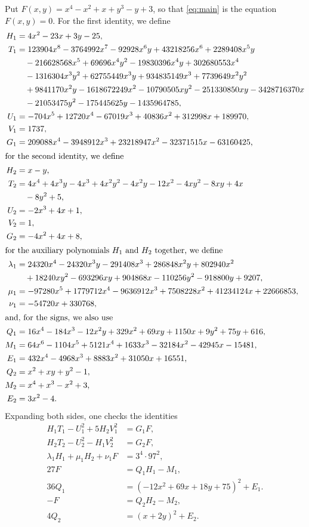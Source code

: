 \documentclass[11pt]{article}
\begin{document}
Put $F(x,y)=x^{4}-x^{2}+x+y^{3}-y+3$, so that \eqref{eq:main} is the equation $F(x,y)=0$. For the first identity, we define
\begin{align*}
H_{1}&=4x^{2}-23x+3y-25,\\
T_{1}&=123904x^{8}-3764992x^{7}-92928x^{6}y+43218256x^{6}+2289408x^{5}y\\
&\quad-216628568x^{5}+69696x^{4}y^{2}-19830396x^{4}y+302680553x^{4}\\
&\quad-1316304x^{3}y^{2}+62755449x^{3}y+934835149x^{3}+7739649x^{2}y^{2}\\
&\quad+9841170x^{2}y-1618672249x^{2}-10790505xy^{2}-251330850xy-3428716370x\\
&\quad-21053475y^{2}-175445625y-1435964785,\\
U_{1}&=-704x^{5}+12720x^{4}-67019x^{3}+40836x^{2}+312998x+189970,\\
V_{1}&=1737,\\
G_{1}&=209088x^{4}-3948912x^{3}+23218947x^{2}-32371515x-63160425,\\
\intertext{for the second identity, we define}
H_{2}&=x-y,\\
T_{2}&=4x^{4}+4x^{3}y-4x^{3}+4x^{2}y^{2}-4x^{2}y-12x^{2}-4xy^{2}-8xy+4x\\
&\quad-8y^{2}+5,\\
U_{2}&=-2x^{3}+4x+1,\\
V_{2}&=1,\\
G_{2}&=-4x^{2}+4x+8,\\
\intertext{for the auxiliary polynomials $H_{1}$ and $H_{2}$ together, we define}
\lambda_{1}&=24320x^{4}-24320x^{3}y-291408x^{3}+286848x^{2}y+802940x^{2}\\
&\quad+18240xy^{2}-693296xy+904868x-110256y^{2}-918800y+9207,\\
\mu_{1}&=-97280x^{5}+1779712x^{4}-9636912x^{3}+7508228x^{2}+41234124x+22666853,\\
\nu_{1}&=-54720x+330768,\\
\intertext{and, for the signs, we also use}
Q_{1}&=16x^{4}-184x^{3}-12x^{2}y+329x^{2}+69xy+1150x+9y^{2}+75y+616,\\
M_{1}&=64x^{6}-1104x^{5}+5121x^{4}+1633x^{3}-32184x^{2}-42945x-15481,\\
E_{1}&=432x^{4}-4968x^{3}+8883x^{2}+31050x+16551,\\
Q_{2}&=x^{2}+xy+y^{2}-1,\\
M_{2}&=x^{4}+x^{3}-x^{2}+3,\\
E_{2}&=3x^{2}-4.
\end{align*}
Expanding both sides, one checks the identities
\begin{align}
H_{1}T_{1}-U_{1}^2+5H_{2}V_{1}^2&=G_{1}F,\label{eq:norm1}\\
H_{2}T_{2}-U_{2}^2-H_{1}V_{2}^2&=G_{2}F,\label{eq:norm2}\\
\lambda_{1}H_{1}+\mu_{1}H_{2}+\nu_{1}F&=3^{4}\cdot 97^{2},\label{eq:cross1}\\
27F&=Q_{1}H_{1}-M_{1},\label{eq:sign1}\\
36Q_{1}&=(-12x^{2}+69x+18y+75)^2+E_{1}.\label{eq:sign1b}\\
-F&=Q_{2}H_{2}-M_{2},\label{eq:sign2}\\
4Q_{2}&=(x+2y)^2+E_{2}.\label{eq:sign2b}
\end{align}
\end{document}

